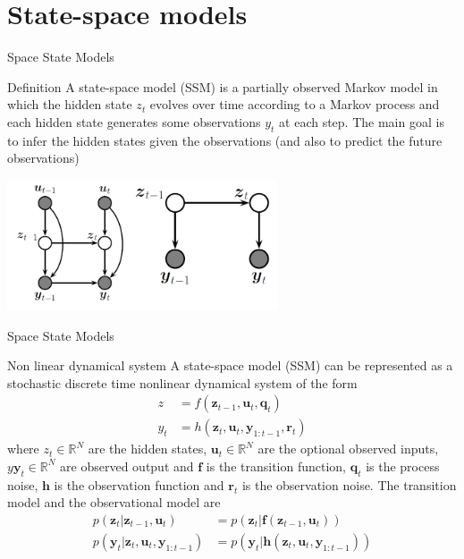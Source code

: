 \documentclass[11pt]{beamer}
\begin{document}
\section{State-space models}

\begin{frame}{Space State Models  \cite{pml2Book}}
\begin{alertblock}{Definition}
A state-space model (SSM) is a partially observed Markov model in which the hidden state $z_{t}$ evolves over time according to a Markov process and each hidden state generates some observations $y_{t}$ at each step. The main goal is to infer the hidden states given the observations (and also to predict the future observations)
\begin{center}
     \includegraphics[width=0.6\textwidth]{Pic/SSM.png}
    \end{center}
    \end{alertblock}
\end{frame}

\begin{frame}{Space State Models  \cite{pml2Book}}
\begin{alertblock}{Non linear dynamical system}
A state-space model (SSM) can be represented as a stochastic discrete time nonlinear dynamical system of the form 
\begin{equation*}
\begin{split}
z &= f(\textbf{z}_{t-1},\textbf{u}_{t},\textbf{q}_{t}) \\
y_{t} &= h(\textbf{z}_{t},\textbf{u}_{t},\textbf{y}_{1:t-1},\textbf{r}_{t})
\end{split}
\end{equation*}
where $z_{t} \in 	\mathbb{R}^{N}$ are the hidden states, $\textbf{u}_{t}  \in 	\mathbb{R}^{N}$ are the optional observed inputs, $y\textbf{y}_{t}  \in 	\mathbb{R}^{N}$ are observed output and $\textbf{f}$ is the transition function, $\textbf{q}_{t}$ is the process noise, $\textbf{h}$ is the observation function and $\textbf{r}_{t}$ is the observation noise. The transition model and the observational model are 
\begin{equation*}
\begin{split}
p(\textbf{z}_{t}|\textbf{z}_{t-1},\textbf{u}_{t})& = p(\textbf{z}_{t}|\textbf{f}(\textbf{z}_{t-1},\textbf{u}_{t}))\\
p(\textbf{y}_{t}|\textbf{z}_{t},\textbf{u}_{t},\textbf{y}_{1:t-1})& =p(\textbf{y}_{t}|\textbf{h}(\textbf{z}_{t},\textbf{u}_{t},\textbf{y}_{1:t-1}))
\end{split}
\end{equation*}
\end{alertblock}
\end{frame}
\end{document}
